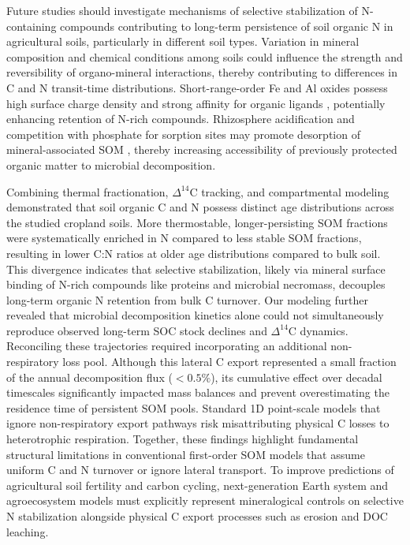 \documentclass[bg, manuscript]{copernicus}
\begin{document}
Future studies should investigate mechanisms of selective stabilization of N-containing compounds contributing to long-term persistence of soil organic N in agricultural soils, particularly in different soil types. Variation in mineral composition and chemical conditions among soils could influence the strength and reversibility of organo-mineral interactions, thereby contributing to differences in C and N transit-time distributions. Short-range-order Fe and Al oxides possess high surface charge density and strong affinity for organic ligands \citep{Wang2013}, potentially enhancing retention of N-rich compounds. Rhizosphere acidification and competition with phosphate for sorption sites may promote desorption of mineral-associated SOM \citep{Keiluweit2015, Spohn2022}, thereby increasing accessibility of previously protected organic matter to microbial decomposition.

\conclusions %
Combining thermal fractionation, $\Delta^{14}\text{C}$ tracking, and compartmental modeling demonstrated that soil organic C and N possess distinct age distributions across the studied cropland soils. More thermostable, longer-persisting SOM fractions were systematically enriched in N compared to less stable SOM fractions, resulting in lower C:N ratios at older age distributions compared to bulk soil. This divergence indicates that selective stabilization, likely via mineral surface binding of N-rich compounds like proteins and microbial necromass, decouples long-term organic N retention from bulk C turnover. Our modeling further revealed that microbial decomposition kinetics alone could not simultaneously reproduce observed long-term SOC stock declines and $\Delta^{14}\text{C}$ dynamics. Reconciling these trajectories required incorporating an additional non-respiratory loss pool. Although this lateral C export represented a small fraction of the annual decomposition flux ($< 0.5\%$), its cumulative effect over decadal timescales significantly impacted mass balances and prevent overestimating the residence time of persistent SOM pools. Standard 1D point-scale models that ignore non-respiratory export pathways risk misattributing physical C losses to heterotrophic respiration. Together, these findings highlight fundamental structural limitations in conventional first-order SOM models that assume uniform C and N turnover or ignore lateral transport. To improve predictions of agricultural soil fertility and carbon cycling, next-generation Earth system and agroecosystem models must explicitly represent mineralogical controls on selective N stabilization alongside physical C export processes such as erosion and DOC leaching.
\end{document}
